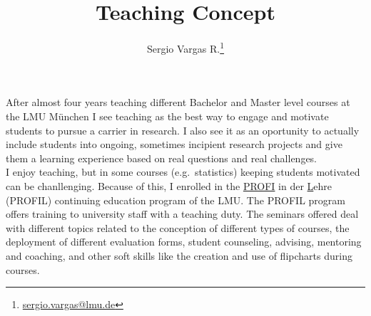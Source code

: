 \documentclass[a4paper,11pt]{article}
\makeatletter
\renewcommand{\maketitle}{\bgroup\setlength{\parindent}{0pt}
\begin{flushleft}
  \thispagestyle{plain}
  \textbf{\@title}

  \@author
\end{flushleft}\egroup
}
\renewenvironment{abstract}
 {\small
  \begin{flushleft}
  \textbf{\abstractname}\vspace{-0.40em}\vspace{0pt}
  \end{flushleft}
  \list{}{
    \setlength{\leftmargin}{0cm}%
    \setlength{\rightmargin}{\leftmargin}%
  }%
  \item\relax}
 {\endlist}
\makeatother
\begin{document}
\title{\Large Teaching Concept\newline}

\author[1]{Sergio Vargas R.\footnote[2]{\href{sergio.vargas@lmu.de}{sergio.vargas@lmu.de}}}


\date{}

\maketitle


After almost four years teaching different Bachelor and Master level courses at the LMU M\"unchen I see teaching as the best way to engage and motivate students to pursue a carrier in research. I also see it as an oportunity to actually include students into ongoing, sometimes incipient research projects and give them a learning experience based on real questions and real challenges.\\

I enjoy teaching, but in some courses (e.g.~statistics) keeping students motivated can be chanllenging. Because of this, I enrolled in the \underline{PROFI} in der \underline{L}ehre (PROFIL) continuing education program of the LMU. The PROFIL program offers training to university staff with a teaching duty. The seminars offered deal with different topics related to the conception of different types of courses, the deployment of different evaluation forms, student counseling, advising, mentoring and coaching, and other soft skills like the creation and use of flipcharts during courses.\\
\end{document}
